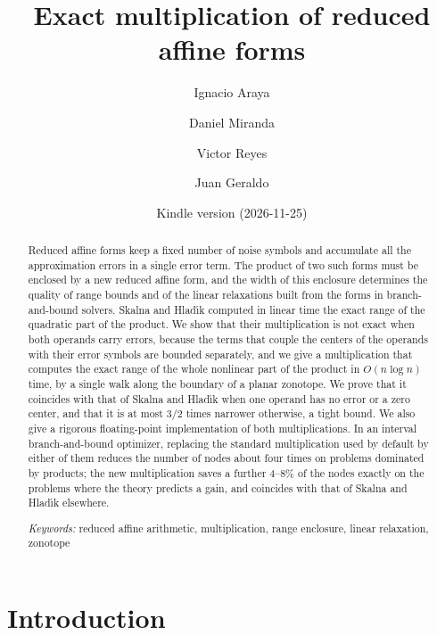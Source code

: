 \documentclass[10pt]{article}
\title{Exact multiplication of reduced affine forms}
\author{Ignacio Araya \and Daniel Miranda \and Victor Reyes \and Juan Geraldo}
\date{\small Kindle version \DIFdelbegin \DIFdel{v28 }\DIFdelend \DIFaddbegin \DIFadd{v29 }\DIFaddend (2026-11-25)}
\theoremstyle{definition}
\begin{document}
\maketitle

\begin{abstract}
Reduced affine forms keep a fixed number of noise symbols and accumulate all the approximation errors in a single error term. The product of two such forms must be enclosed by a new reduced affine form, and the width of this enclosure determines the quality of range bounds and of the linear relaxations built from the forms in branch-and-bound solvers. Skalna and Hlad\'{\i}k computed in linear time the exact range of the quadratic part of the product. We show that their multiplication is not exact when both operands carry errors, because the terms that couple the centers of the operands with their error symbols are bounded separately, and we give a multiplication that computes the exact range of the whole nonlinear part of the product in $O(n\log n)$ time, by a single walk along the boundary of a planar zonotope. We prove that it coincides with that of Skalna and Hlad\'{\i}k when one operand has no error or a zero center, and that it is at most $3/2$ times narrower otherwise, a tight bound. We also give a rigorous floating-point implementation of both multiplications. In an interval branch-and-bound optimizer, replacing the standard multiplication used by default by either of them reduces the number of nodes about four times on problems dominated by products; the new multiplication saves a further 4--8\% of the nodes exactly on the problems where the theory predicts a gain, and coincides with that of Skalna and Hlad\'{\i}k elsewhere.

\medskip\noindent
\textit{Keywords:} reduced affine arithmetic, multiplication, range enclosure, linear relaxation, zonotope
\end{abstract}

\section{Introduction}
\end{document}
